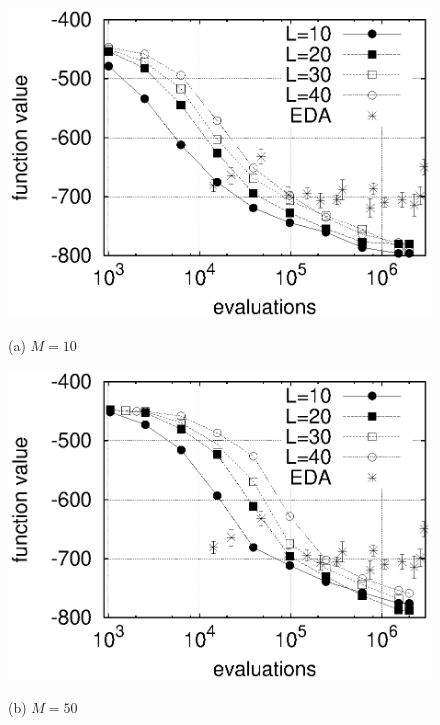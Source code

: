 \begin{figure}
\centering
\centerline{\includegraphics[width=\figlength\linewidth]{./data_his/his_2dising_s10.eps}}
(a) $M=10$ \\
\vspace{0.1in}
\centerline{\includegraphics[width=\figlength\linewidth]{./data_his/his_2dising_s50.eps}}
(b) $M=50$
\caption{}
\label{his-2d-ising}
\end{figure}


